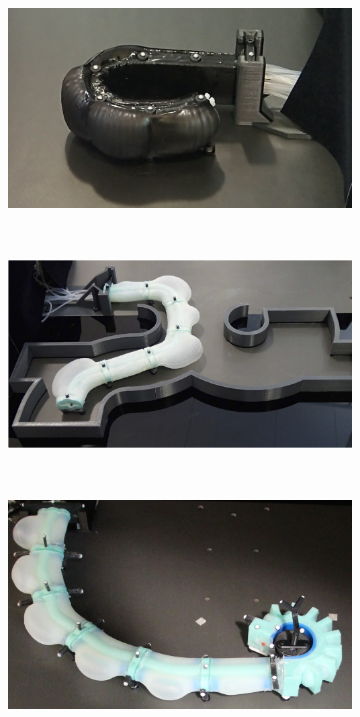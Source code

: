 \begin{figure}[ht]
\centering
        \begin{subfigure}[t]{0.7\columnwidth}
        \includegraphics[width=\textwidth]{figures/introduction/ribbed_introduction}
        \end{subfigure}\\
        \begin{subfigure}[t]{0.7\columnwidth}
        \includegraphics[width=\textwidth]{figures/introduction/cylindrical_introduction}
        \end{subfigure}\\
        \begin{subfigure}[t]{0.7\columnwidth}
        \includegraphics[width=\textwidth]{figures/introduction/gripper_introduction}

\end{subfigure}
\end{figure}
